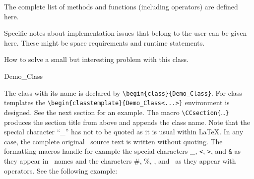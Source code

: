 \documentclass[12pt]{article}
\begin{document}
\operations The complete list of methods and functions (including
operators) are defined here.

\implementation Specific notes about implementation issues that belong
to the user can be given here. These might be space requirements and
runtime statements.

\example How to solve a small but interesting problem with this class.


\begin{class}{Demo_Class}

The class with its name is declared by \verb"\begin{class}{Demo_Class}". 
For class templates the \verb"\begin{classtemplate}{Demo_Class<...>}"
environment is  designed. See the next section for an example.
The macro \verb"\CCsection{"\ldots\verb"}" produces the section
title from above and appends the class name. Note that the special
character ``\_'' has not to be quoted as it is usual within \LaTeX.
In any case, the complete original \CC\ source text is written
without quoting. The formatting macros handle for example the special
characters \_, {\tt <}, {\tt >}, and {\tt \&} as they appear in \CC\
names and the characters \#, \%, \CChat, and \CCtilde\ as they appear
with operators. See the following example: 
\CCstyle{
    #define %

This example is created using the {\verb+\CC+}{\tt style} macro
that formats its single parameter in this style.

To achieve this behavior with \TeX\, the \verb"\catcode" values of
some characters has to be changed. So within the \CC\ code 
things like comments with ``\%'' sign will not work. Several macros read a
second parameter with a \TeX\ comment to the declaration. The catcodes
are restored just before this second parameter. A sad sideeffect is
that these changed catcodes will not apply if these macros are invoked
within other macros. In that case, the argument text was just once
parsed from \TeX\ and the catcodes are all fixed before the catcode
changing macro expands.

\definition 

The class \classname\ does nothing. The formatted name of the class
can be accessed using the macro \verb"\classname". The unformatted
name as it was originally written can be accessed using the
\verb"\pureclassname" macro.

}
\end{class}
\end{document}

